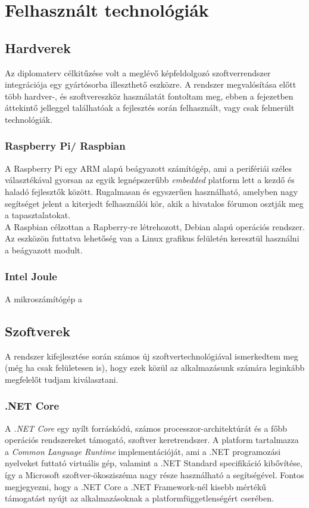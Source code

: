 \chapter{Felhasznált technológiák} \label{chapter:technologiak}
\section{Hardverek}

Az diplomaterv célkitűzése volt a meglévő képfeldolgozó szoftverrendszer integrációja egy gyártósorba illeszthető eszközre. A rendszer megvalósítása előtt több hardver-, és szoftvereszköz használatát fontoltam meg, ebben a fejezetben áttekintő jelleggel találhatóak a fejlesztés során felhasznált, vagy csak felmerült technológiák.

\subsection{Raspberry Pi/ Raspbian}

A Raspberry Pi egy ARM alapú beágyazott számítógép, ami a perifériái széles választékával gyorsan az egyik legnépszerűbb \textit{embedded} platform lett a kezdő és haladó fejlesztők között. Rugalmasan és egyszerűen használható, amelyben nagy segítséget jelent a kiterjedt felhasználói kör, akik a hivatalos fórumon osztják meg a tapasztalatokat. \\
A Raspbian célzottan a Rapberry-re létrehozott, Debian alapú operációs rendszer. Az eszközön futtatva lehetőség van a Linux grafikus felületén keresztül használni a beágyazott modult.

\subsection{Intel Joule}

A mikroszámítógép a 

\section{Szoftverek}

A rendszer kifejlesztése során számos új szoftvertechnológiával ismerkedtem meg (még ha csak felületesen is), hogy ezek közül az alkalmazásunk számára leginkább megfelelőt tudjam kiválasztani.

\subsection{.NET Core} \label{subsec:netcore_intro}
A \emph{.NET Core} egy nyílt forráskódú, számos processzor-architektúrát és a főbb operációs rendszereket támogató, szoftver keretrendszer. A platform tartalmazza a \emph{Common Language Runtime} implementációját, ami a .NET programozási nyelveket futtató virtuális gép, valamint a .NET Standard specifikáció kibővítése, így a Microsoft szoftver-ökosziszéma nagy része használható a segítségével. Fontos megjegyezni, hogy a .NET Core a .NET Framework-nél kisebb mértékű támogatást nyújt az alkalmazásoknak a platformfüggetlenségért cserében. 

